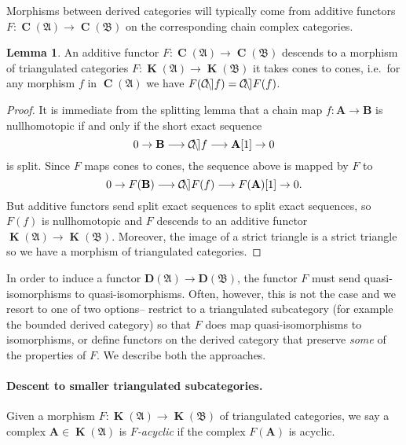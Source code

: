 \documentclass[a4paper]{article}
\theoremstyle{definition}
\newtheorem{lemma}[defn]{Lemma}
\theoremstyle{remark}
\DeclareMathOperator{\cone}{\mathcal{C\kern -2pt o \kern -2pt n \kern -2pt e
\kern -2pt}}
\DeclareMathOperator{\Ch}{\mathbf{C}}
\DeclareMathOperator{\kom}{{\mathbf{K}}}
\newcommand{\deri}{\mathbf{D}}
\begin{document}
Morphisms between derived categories will typically come from
additive functors \(F:\Ch(\mathfrak{A})\rightarrow \Ch(\mathfrak{B})\) on the
corresponding chain complex categories.

\begin{lemma}\label{descent-to-homotopy}
    An additive functor \(F:\Ch(\mathfrak{A})\rightarrow \Ch(\mathfrak{B})\)
    descends to a morphism of triangulated categories
    \(F:\kom(\mathfrak{A})\rightarrow \kom(\mathfrak{B})\)
    it takes cones to cones, i.e.\ for any morphism \(f\) in
    \(\Ch(\mathfrak{A})\) we have \({F(\cone f) = \cone F(f)}\).
    \begin{proof}
        It is immediate from the splitting lemma that a chain map
        \(f:\mathbf{A}\rightarrow\mathbf{B}\) is nullhomotopic if and only if
        the short exact sequence 
        \[0\rightarrow \mathbf{B}\longrightarrow \cone f \longrightarrow
        \mathbf{A}[1] \rightarrow 0\]
        is split. Since \(F\) maps cones to cones, the sequence above is mapped
        by \(F\) to
        \[0\rightarrow F(\mathbf{B}) \longrightarrow \cone F(f)\longrightarrow
        F(\mathbf{A})[1]\rightarrow 0.\]
        But additive functors send split exact sequences to split exact
        sequences, so \(F(f)\) is nullhomotopic and \(F\) descends to an
        additive functor \(\kom(\mathfrak{A})\rightarrow \kom(\mathfrak{B})\).
        Moreover, the image of a strict triangle is a strict triangle
        so we have a morphism of triangulated categories.
    \end{proof}
\end{lemma}

In order to induce a functor \(\deri(\mathfrak{A})\rightarrow
\deri(\mathfrak{B})\), the functor \(F\) must send quasi-isomorphisms to
quasi-isomorphisms. Often, however, this is not the case and we resort to one of
two options-- restrict to a triangulated subcategory (for example the bounded
derived category) so that \(F\) does map quasi-isomorphisms to isomorphisms, or
define functors on the derived category that preserve \textit{some} of the
properties of \(F\). We describe both the approaches.

\paragraph{Descent to smaller triangulated subcategories.} 
Given a morphism \(F:\kom(\mathfrak{A})\rightarrow \kom(\mathfrak{B})\) of
triangulated categories, we say a complex \(\mathbf{A}\in \kom(\mathfrak{A})\)
is \textit{\(F\)-acyclic} if the complex \(F(\mathbf{A})\) is acyclic. 
\end{document}
